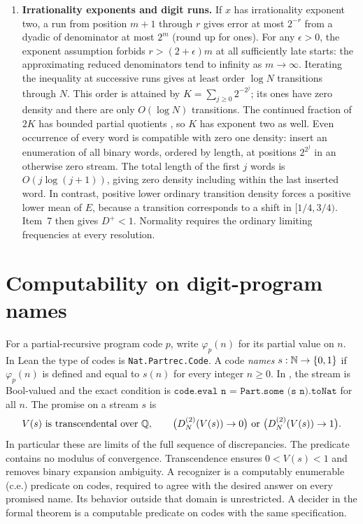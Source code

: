 \documentclass[11pt]{article}
\begin{document}
\begin{enumerate}[leftmargin=*,label=\textbf{\arabic*.}]
\item \textbf{Irrationality exponents and digit runs.}
If \(x\) has irrationality exponent two, a run from position \(m+1\) through \(r\) gives error at most \(2^{-r}\) from a dyadic of denominator at most \(2^m\) (round up for ones). For any \(\epsilon>0\), the exponent assumption forbids \(r>(2+\epsilon)m\) at all sufficiently late starts: the approximating reduced denominators tend to infinity as \(m\to\infty\). Iterating the inequality at successive runs gives at least order \(\log N\) transitions through \(N\). This order is attained by \(K=\sum_{j\ge0}2^{-2^j}\); its ones have zero density and there are only \(O(\log N)\) transitions. The continued fraction of \(2K\) has bounded partial quotients \cite[pp.~240--242]{folded}, so \(K\) has exponent two as well. Even occurrence of every word is compatible with zero one density: insert an enumeration of all binary words, ordered by length, at positions \(2^{2^j}\) in an otherwise zero stream. The total length of the first \(j\) words is \(O(j\log(j+1))\), giving zero density including within the last inserted word. In contrast, positive lower ordinary transition density forces a positive lower mean of \(E\), because a transition corresponds to a shift in \([1/4,3/4)\). Item~7 then gives \(D^+<1\). Normality requires the ordinary limiting frequencies at every resolution.
\end{enumerate}

\section{Computability on digit-program names}\label{sec:computable}

For a partial-recursive program code \(p\), write \(\varphi_p(n)\) for its partial value on \(n\). In Lean the type of codes is \nolinkurl{Nat.Partrec.Code}. A code \emph{names} \(s:\mathbb N\to\{0,1\}\) if \(\varphi_p(n)\) is defined and equal to \(s(n)\) for every integer \(n\ge0\). In , the stream is Bool-valued and the exact condition is
\(\texttt{code.eval n = Part.some (s n).toNat}\) for all \(n\).
The promise  on a stream \(s\) is
\[
 V(s)\text{ is transcendental over }\Q,\qquad
 \big(D_N^{(2)}(V(s))\to0\big)\ \text{or}\ \big(D_N^{(2)}(V(s))\to1\big).
\]
In particular these are limits of the full sequence of discrepancies. The predicate contains no modulus of convergence. Transcendence ensures \(0<V(s)<1\) and removes binary expansion ambiguity. A recognizer is a computably enumerable (c.e.) predicate on codes, required to agree with the desired answer on every promised name. Its behavior outside that domain is unrestricted. A decider in the formal theorem is a computable predicate on codes with the same specification.
\end{document}
